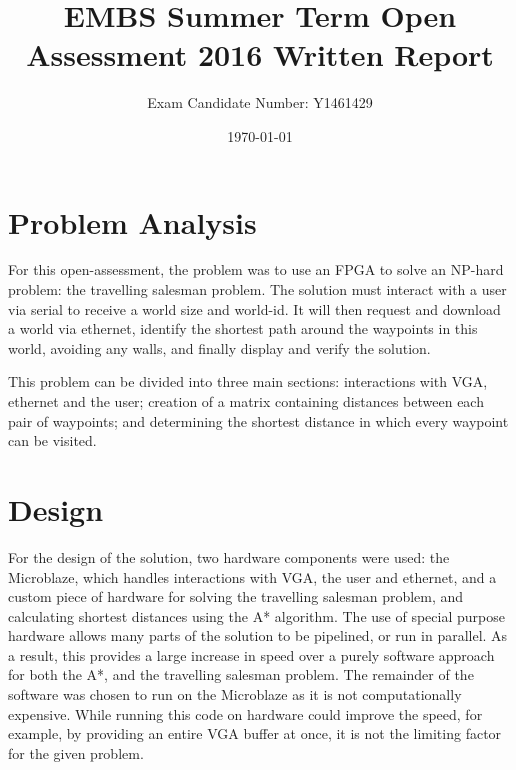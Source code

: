 \documentclass[a4paper, 11pt]{article}
\title{EMBS Summer Term Open Assessment 2016 Written Report}
\author{Exam Candidate Number: Y1461429}
\date{\today}
\begin{document}
\maketitle
\section{Problem Analysis} %
For this open-assessment, the problem was to use an FPGA to solve an NP-hard 
problem: the travelling salesman problem. The solution must interact with a user 
via serial to receive a world size and world-id. It will then
request and download a world via ethernet, identify the shortest path around the 
waypoints in this world, avoiding any walls, and finally display and verify the solution. 
\par\bigskip\noindent
This problem can be divided into three main sections: interactions with VGA, ethernet
and the user; creation of a matrix containing distances between each pair of waypoints;
and determining the shortest distance in which every waypoint can be visited.

\section{Design} %
For the design of the solution, two hardware components were used: the Microblaze, 
which handles interactions with VGA, the user and ethernet, 
and a custom piece of hardware for solving the travelling salesman problem, and 
calculating shortest distances using the A* algorithm. The use of special purpose 
hardware allows many parts of the solution to be pipelined, or run in parallel. 
As a result, this provides a large increase in speed over a purely software approach 
for both the A*, and the travelling salesman problem. The remainder of the software 
was chosen to run on the Microblaze as it is not computationally expensive. 
While running this code on hardware could improve the speed, for example, by 
providing an entire VGA buffer at once, it is not the limiting factor for the 
given problem.
\end{document}
